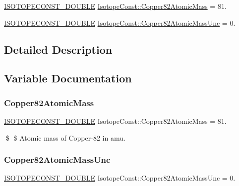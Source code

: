 \begin{DoxyCompactItemize}
\item 
\mbox{\hyperlink{group___isotope_const-_macros_ga8f45a7272ce02c0b4c65c44636ed719a}{I\+S\+O\+T\+O\+P\+E\+C\+O\+N\+S\+T\+\_\+\+D\+O\+U\+B\+LE}} \mbox{\hyperlink{group___isotope_const-_copper-_cu82_ga605460cc2dba04b28a1b1d6ade43809b}{Isotope\+Const\+::\+Copper82\+Atomic\+Mass}} = 81.
\item 
\mbox{\hyperlink{group___isotope_const-_macros_ga8f45a7272ce02c0b4c65c44636ed719a}{I\+S\+O\+T\+O\+P\+E\+C\+O\+N\+S\+T\+\_\+\+D\+O\+U\+B\+LE}} \mbox{\hyperlink{group___isotope_const-_copper-_cu82_gacc42aa9f3d76eea5d4c6d97811abb902}{Isotope\+Const\+::\+Copper82\+Atomic\+Mass\+Unc}} = 0.
\end{DoxyCompactItemize}


\subsection{Detailed Description}


\subsection{Variable Documentation}
\mbox{\label{group___isotope_const-_copper-_cu82_ga605460cc2dba04b28a1b1d6ade43809b}} 
\subsubsection{\texorpdfstring{Copper82\+Atomic\+Mass}{Copper82AtomicMass}}
{\footnotesize\ttfamily \mbox{\hyperlink{group___isotope_const-_macros_ga8f45a7272ce02c0b4c65c44636ed719a}{I\+S\+O\+T\+O\+P\+E\+C\+O\+N\+S\+T\+\_\+\+D\+O\+U\+B\+LE}} Isotope\+Const\+::\+Copper82\+Atomic\+Mass = 81.}

\$ \$ Atomic mass of Copper-\/82 in amu. \mbox{\label{group___isotope_const-_copper-_cu82_gacc42aa9f3d76eea5d4c6d97811abb902}} 
\subsubsection{\texorpdfstring{Copper82\+Atomic\+Mass\+Unc}{Copper82AtomicMassUnc}}
{\footnotesize\ttfamily \mbox{\hyperlink{group___isotope_const-_macros_ga8f45a7272ce02c0b4c65c44636ed719a}{I\+S\+O\+T\+O\+P\+E\+C\+O\+N\+S\+T\+\_\+\+D\+O\+U\+B\+LE}} Isotope\+Const\+::\+Copper82\+Atomic\+Mass\+Unc = 0.}

